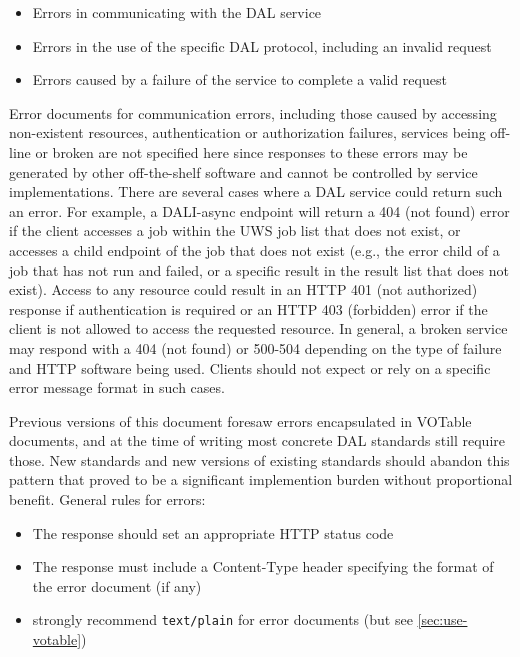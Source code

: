 \documentclass[11pt,letter]{ivoa}
\begin{document}
\begin{itemize}
\item Errors in communicating with the DAL service

\item Errors in the use of the specific DAL protocol, including an invalid
request

\item Errors caused by a failure of the service to complete a valid request
\end{itemize}

Error documents for communication errors, including those caused by accessing
non-existent resources, authentication or authorization failures, services being
off-line or broken are not specified here since responses to these errors may be
generated by other off-the-shelf software and cannot be controlled by service
implementations. There are several cases where a DAL service could return such
an error. For example, a DALI-async endpoint will return a 404 (not found) error if
the client accesses a job within the UWS job list that does not exist, or
accesses a child endpoint of the job that does not exist (e.g., the error
child of a job that has not run and failed, or a specific result in
the result list  that does not exist). Access to any resource could result
in an HTTP 401 (not authorized) response if authentication is required or an
HTTP 403 (forbidden) error if the client is not allowed to access the requested
resource. In general, a broken service may respond with a 404 (not found) or 500-504
depending on the type of failure and HTTP software being used. Clients should not
expect or rely on a specific error message format in such cases.

Previous versions of this document foresaw errors encapsulated in VOTable documents,
and at the time of writing most concrete DAL standards still require those. New
standards and new versions of existing standards should abandon this pattern that
proved to be a significant implemention burden without proportional benefit. General
rules for errors:
\begin{itemize}
\item The response should set an appropriate HTTP status code
\item The response must include a Content-Type header specifying the format of the error document (if any)
\item strongly recommend \verb|text/plain| for error documents (but see \ref{sec:use-votable})
\end{itemize}
\end{document}
